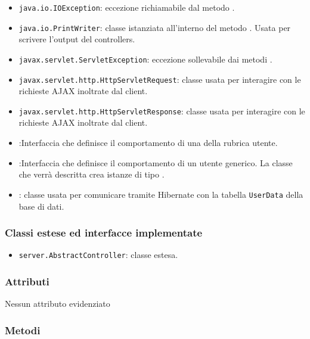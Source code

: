\begin{itemize}
	\item \texttt{java.io.IOException}: eccezione richiamabile dal metodo .
	\item \texttt{java.io.PrintWriter}: classe istanziata all'interno del metodo . Usata per scrivere l'output del controllers.
	\item \texttt{javax.servlet.ServletException}: eccezione sollevabile dai metodi .
	\item \texttt{javax.servlet.http.HttpServletRequest}: classe usata per interagire con le richieste AJAX inoltrate dal client.
	\item \texttt{javax.servlet.http.HttpServletResponse}: classe usata per interagire con le richieste AJAX inoltrate dal client.
	\item {}:Interfaccia che definisce il comportamento di una  della rubrica utente.
	\item {}:Interfaccia che definisce il comportamento di un utente generico. La classe che verrà descritta crea istanze di tipo .
	\item {}: classe usata per comunicare tramite Hibernate con la tabella \texttt{UserData} della base di dati.
\end{itemize}

\subsubsection*{Classi estese ed interfacce implementate}
\begin{itemize}
	\item \texttt{server.AbstractController}: classe estesa.
\end{itemize}

\subsubsection*{Attributi}

Nessun attributo evidenziato

\subsubsection*{Metodi}

